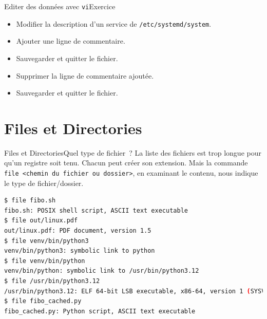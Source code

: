 \documentclass{beamer}
\begin{document}
    \begin{frame}{Editer des données avec \lstinline{vi}}{Exercice \execcounterdispinc}
        \begin{itemize}
            \item Modifier la description d'un service de \lstinline{/etc/systemd/system}.
            \item Ajouter une ligne de commentaire.
            \item Sauvegarder et quitter le fichier.
            \item Supprimer la ligne de commentaire ajoutée.
            \item Sauvegarder et quitter le fichier.
        \end{itemize}
    \end{frame}

    \section{Files et Directories}\label{sec:files-directories}

    \begin{frame}[fragile]{Files et Directories}{Quel type de fichier~?}
        La liste des fichiers est trop longue pour qu'un registre soit tenu.
        Chacun peut créer son extension.
        Mais la commande \lstinline{file <chemin du fichier ou dossier>}, en examinant le contenu, nous indique le type de fichier/dossier.
        \begin{lstlisting}[language=bash]
$ file fibo.sh
fibo.sh: POSIX shell script, ASCII text executable
$ file out/linux.pdf
out/linux.pdf: PDF document, version 1.5
$ file venv/bin/python3
venv/bin/python3: symbolic link to python
$ file venv/bin/python
venv/bin/python: symbolic link to /usr/bin/python3.12
$ file /usr/bin/python3.12
/usr/bin/python3.12: ELF 64-bit LSB executable, x86-64, version 1 (SYSV), dynamically linked, interpreter /lib64/ld-linux-x86-64.so.2, BuildID[sha1]=ccd329aaf9256b96135a9e3f97cbf4c3829377e1, for GNU/Linux 3.2.0, stripped
$ file fibo_cached.py
fibo_cached.py: Python script, ASCII text executable
        \end{lstlisting}
    \end{frame}
\end{document}
